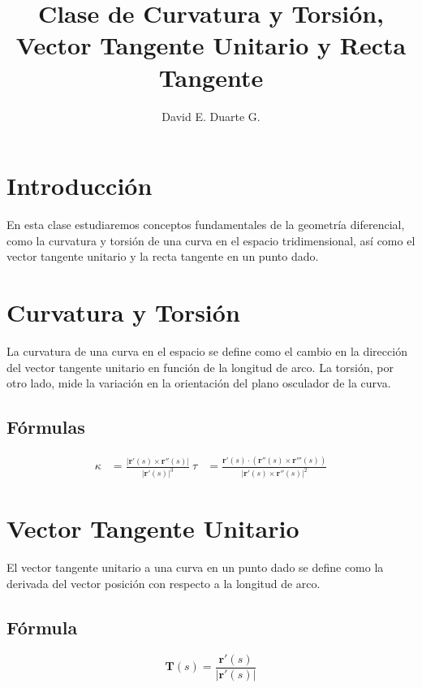 \documentclass{article} \usepackage[utf8]{inputenc} \usepackage{amsmath}
\begin{document}
	
	\title{Clase de Curvatura y Torsión, Vector Tangente Unitario y Recta Tangente} \author{David E. Duarte G.} \date{}
	
	\maketitle
	
	\section{Introducción} En esta clase estudiaremos conceptos fundamentales de la geometría diferencial, como la curvatura y torsión de una curva en el espacio tridimensional, así como el vector tangente unitario y la recta tangente en un punto dado.
	
	\section{Curvatura y Torsión} La curvatura de una curva en el espacio se define como el cambio en la dirección del vector tangente unitario en función de la longitud de arco. La torsión, por otro lado, mide la variación en la orientación del plano osculador de la curva.
	
	\subsection{Fórmulas} \begin{align*} \kappa &= \frac{\lvert \textbf{r}'(s) \times \textbf{r}''(s) \rvert}{\lvert \textbf{r}'(s) \rvert^3}
		 \ \tau &= \frac{\textbf{r}'(s) \cdot (\textbf{r}''(s) \times \textbf{r}'''(s))}{\lvert \textbf{r}'(s) \times \textbf{r}''(s) \rvert^2} \end{align*}
	
	\section{Vector Tangente Unitario} El vector tangente unitario a una curva en un punto dado se define como la derivada del vector posición con respecto a la longitud de arco.
	
	\subsection{Fórmula} \begin{equation*} \textbf{T}(s) = \frac{\textbf{r}'(s)}{\lvert \textbf{r}'(s) \rvert} \end{equation*}
	
\end{document}
